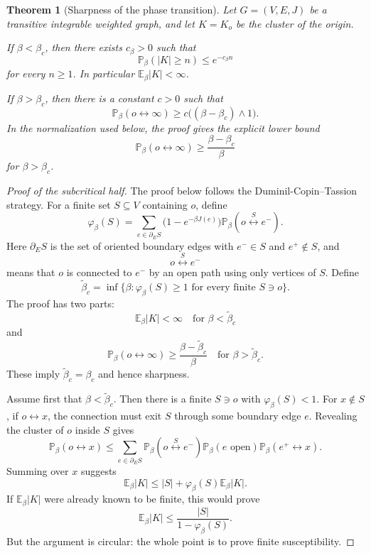 \documentclass[11pt,reqno]{book}
\numberwithin{equation}{chapter}
\theoremstyle{plain}
\newtheorem{theorem}{Theorem}[chapter]
\theoremstyle{definition}
\theoremstyle{remark}
\newcommand{\Pb}{\mathbb P_\beta}
\newcommand{\Eb}{\mathbb E_\beta}
\newcommand{\1}{\mathbf 1}
\begin{document}
\begin{theorem}[Sharpness of the phase transition]
Let $G=(V,E,J)$ be a transitive integrable weighted graph, and let $K=K_o$ be the cluster of the origin.

If $\beta<\beta_c$, then there exists $c_\beta>0$ such that
\[
  \Pb(|K|\geq n)\leq e^{-c_\beta n}
\]
for every $n\geq 1$. In particular $\Eb |K|<\infty$.

If $\beta>\beta_c$, then there is a constant $c>0$ such that
\[
  \Pb(o\leftrightarrow\infty)
  \geq
  c\bigl((\beta-\beta_c)\wedge 1\bigr).
\]
In the normalization used below, the proof gives the explicit lower bound
\[
  \Pb(o\leftrightarrow\infty)\geq \frac{\beta-\beta_c}{\beta}
\]
for $\beta>\beta_c$.
\end{theorem}

\begin{proof}[Proof of the subcritical half]
The proof below follows the Duminil-Copin--Tassion strategy. For a finite set $S\subseteq V$ containing $o$, define
\[
  \varphi_\beta(S)
  =
  \sum_{e\in\partial_E S}
  \bigl(1-e^{-\beta J(e)}\bigr)
  \Pb(o\stackrel S\leftrightarrow e^-).
\]
Here $\partial_E S$ is the set of oriented boundary edges with $e^-\in S$ and $e^+\notin S$, and
\[
  o\stackrel S\leftrightarrow e^-
\]
means that $o$ is connected to $e^-$ by an open path using only vertices of $S$. Define
\[
  \widetilde\beta_c
  =
  \inf\{\beta:\varphi_\beta(S)\geq 1
  \text{ for every finite }S\ni o\}.
\]
The proof has two parts:
\[
  \Eb |K|<\infty\quad\text{for }\beta<\widetilde\beta_c
\]
and
\[
  \Pb(o\leftrightarrow\infty)
  \geq
  \frac{\beta-\widetilde\beta_c}{\beta}
  \quad\text{for }\beta>\widetilde\beta_c.
\]
These imply $\widetilde\beta_c=\beta_c$ and hence sharpness.

Assume first that $\beta<\widetilde\beta_c$. Then there is a finite $S\ni o$ with $\varphi_\beta(S)<1$. For $x\notin S$, if $o\leftrightarrow x$, the connection must exit $S$ through some boundary edge $e$. Revealing the cluster of $o$ inside $S$ gives
\[
  \Pb(o\leftrightarrow x)
  \leq
  \sum_{e\in\partial_E S}
  \Pb(o\stackrel S\leftrightarrow e^-)
  \Pb(e\text{ open})
  \Pb(e^+\leftrightarrow x).
\]
Summing over $x$ suggests
\[
  \Eb |K|
  \leq
  |S|+\varphi_\beta(S)\Eb |K|.
\]
If $\Eb |K|$ were already known to be finite, this would prove
\[
  \Eb |K|\leq \frac{|S|}{1-\varphi_\beta(S)}.
\]
But the argument is circular: the whole point is to prove finite susceptibility.


\end{proof}
\end{document}
